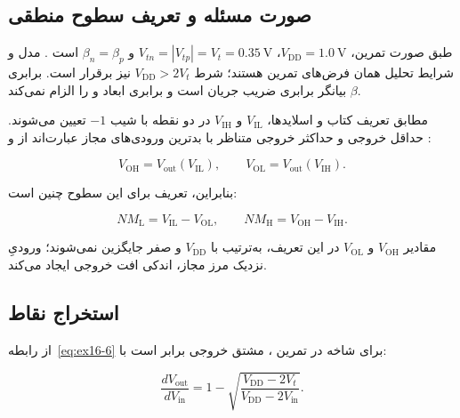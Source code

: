 \label{sec:ex17}

\subsection*{صورت مسئله و تعریف سطوح منطقی}

طبق صورت تمرین، \(V_{\mathrm{DD}}=\qty{1.0}{\volt}\)، \(V_{tn}=|V_{tp}|=V_t=\qty{0.35}{\volt}\) و \(\beta_n=\beta_p\) است \cite[صفحه چاپی ۹۷]{weste}. مدل و شرایط تحلیل همان فرض‌های تمرین  هستند؛ شرط \(V_{\mathrm{DD}}>2V_t\) نیز برقرار است. برابری \(\beta\) بیانگر برابری ضریب جریان است و برابری ابعاد  و  را الزام نمی‌کند.

مطابق تعریف کتاب و اسلایدها، \(V_{\mathrm{IL}}\) و \(V_{\mathrm{IH}}\) در دو نقطه  با شیب \(-1\) تعیین می‌شوند. حداقل خروجی  و حداکثر خروجی  متناظر با بدترین ورودی‌های مجاز عبارت‌اند از \cite[بخش ]{weste} و \cite[اسلایدهای ۹ و ۱۰]{dcslides}:

\nopagebreak[3]
\begin{equation}\label{eq:ex17-1}
V_{\mathrm{OH}}=V_{\mathrm{out}}(V_{\mathrm{IL}}),\qquad
V_{\mathrm{OL}}=V_{\mathrm{out}}(V_{\mathrm{IH}}).
\end{equation}

بنابراین، تعریف  برای این سطوح چنین است:

\nopagebreak[3]
\begin{equation}\label{eq:ex17-2}
NM_{\mathrm{L}}=V_{\mathrm{IL}}-V_{\mathrm{OL}},\qquad
NM_{\mathrm{H}}=V_{\mathrm{OH}}-V_{\mathrm{IH}}.
\end{equation}

مقادیر \(V_{\mathrm{OH}}\) و \(V_{\mathrm{OL}}\) در این تعریف، به‌ترتیب با \(V_{\mathrm{DD}}\) و صفر جایگزین نمی‌شوند؛ ورودیِ نزدیک مرز مجاز، اندکی افت خروجی ایجاد می‌کند.

\subsection*{استخراج نقاط }

از رابطه~\eqref{eq:ex16-6} برای شاخه  در تمرین ، مشتق خروجی برابر است با:

\nopagebreak[3]
\begin{equation}\label{eq:ex17-3}
\frac{dV_{\mathrm{out}}}{dV_{\mathrm{in}}}
=1-\sqrt{\frac{V_{\mathrm{DD}}-2V_t}{V_{\mathrm{DD}}-2V_{\mathrm{in}}}}.
\end{equation}

